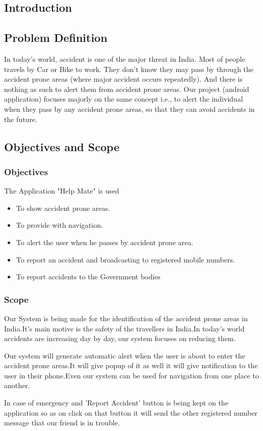 \documentclass{article}
\begin{document}
\listoftables
\newpage
{} 
\setcounter{page}{1}
\begin{flushleft}
    \section{Introduction}
        \subsection{Problem Definition}
        \justifying
        In today's world, accident is one of the major threat in India. Most of people travels by Car or Bike to work. They don't know they may pass by through the accident prone areas (where major accident occurs repeatedly). And there is nothing as such to alert them from accident prone areas.
        Our project (android application) focuses majorly on the same concept i.e., to alert the individual when they pass by any accident prone areas, so that they can avoid accidents in the future.
        \subsection{Objectives and Scope}
        \subsubsection{Objectives}
        The Application "Help Mate" is used  
         \begin{itemize}
        \item To show accident prone areas.
        \item To provide with navigation.
        \item To alert the user when he passes by accident prone area.
        \item To report an accident and broadcasting to registered mobile numbers.
        \item To report accidents to the Government bodies
        \end{itemize}
        \subsubsection{Scope}
        \justifying
        Our System is being made for the identification of the accident prone areas in India.It's main motive is the safety of the travellers in India.In today's world accidents are increasing day by day, our system focuses on reducing them.
        \par
        Our system will generate automatic alert when the user is about to enter the accident prone areas.It will give popup of it as well it will give notification to the user in their phone.Even our system can be used for navigation from one place to another.
        \par 
        In case of emergency and 'Report Accident' button is being kept on the application so as on click on that button it will send the other registered number message that our friend is in trouble.
        

\end{flushleft}
\end{document}
